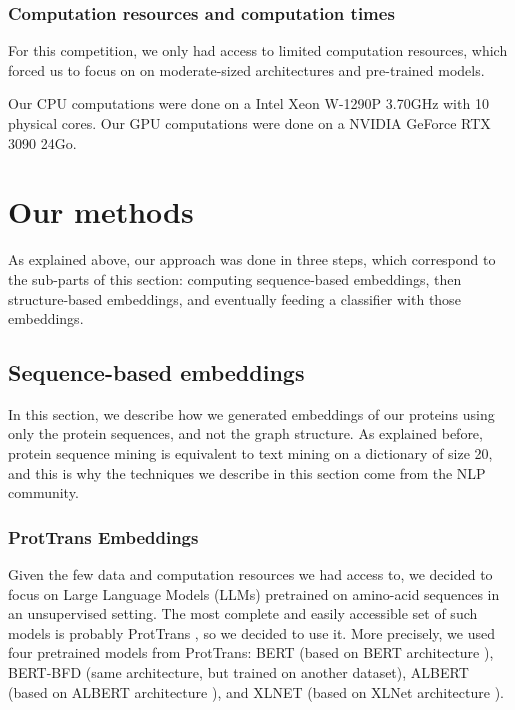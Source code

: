 \documentclass[final]{cvpr}
\begin{document}
\subsubsection{Computation resources and computation times}

For this competition, we only had access to limited computation resources, which forced us to focus on on moderate-sized architectures and pre-trained models.

Our CPU computations were done on a Intel Xeon W-1290P 3.70GHz with 10 physical cores. Our GPU computations were done on a NVIDIA GeForce RTX 3090 24Go.

\section{Our methods}

As explained above, our approach was done in three steps, which correspond to the sub-parts of this section: computing sequence-based embeddings, then structure-based embeddings, and eventually feeding a classifier with those embeddings.

\subsection{Sequence-based embeddings} \label{sec:sequentialFeatures}

In this section, we describe how we generated embeddings of our proteins using only the protein sequences, and not the graph structure. As explained before, protein sequence mining is equivalent to text mining on a dictionary of size 20, and this is why the techniques we describe in this section come from the NLP community.

\subsubsection{ProtTrans Embeddings}

Given the few data and computation resources we had access to, we decided to focus on Large Language Models (LLMs) pretrained on amino-acid sequences in an unsupervised setting. The most complete and easily accessible set of such models is probably ProtTrans \cite{protTrans}, so we decided to use it. More precisely, we used four pretrained models from ProtTrans: BERT (based on BERT architecture \cite{Bert2018}), BERT-BFD (same architecture, but trained on another dataset), ALBERT (based on ALBERT architecture \cite{Albert2019}), and XLNET (based on XLNet architecture \cite{XLNet2019}).
\end{document}
